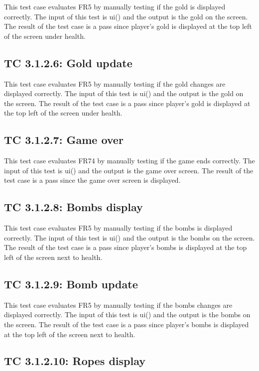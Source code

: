 \documentclass[12pt, titlepage]{article}
\begin{document}
This test case evaluates FR5 by manually testing if the gold is displayed correctly. The input of this test is ui() and the output is the gold on the screen. The result of the test case is a pass since player's gold is displayed at the top left of the screen under health.

\subsection*{TC 3.1.2.6: Gold update}

This test case evaluates FR5 by manually testing if the gold changes are displayed correctly. The input of this test is ui() and the output is the gold on the screen. The result of the test case is a pass since player's gold is displayed at the top left of the screen under health.

\subsection*{TC 3.1.2.7: Game over}

This test case evaluates FR74 by manually testing if the game ends correctly. The input of this test is ui() and the output is the game over screen. The result of the test case is a pass since the game over screen is displayed.

\subsection*{TC 3.1.2.8: Bombs display}

This test case evaluates FR5 by manually testing if the bombs is displayed correctly. The input of this test is ui() and the output is the bombs on the screen. The result of the test case is a pass since player's bombs is displayed at the top left of the screen next to health.

\subsection*{TC 3.1.2.9: Bomb update}

This test case evaluates FR5 by manually testing if the bombs changes are displayed correctly. The input of this test is ui() and the output is the bombs on the screen. The result of the test case is a pass since player's bombs is displayed at the top left of the screen next to health.

\subsection*{TC 3.1.2.10: Ropes display}
\end{document}
